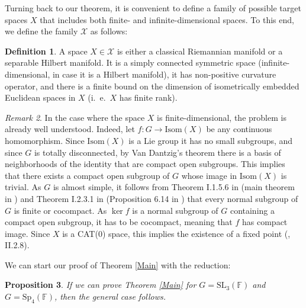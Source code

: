 \documentclass{article}
\theoremstyle{definition}
\newtheorem{dfn}{Definition}[section]
\theoremstyle{remark}
\newtheorem{rmk}[dfn]{Remark}
\theoremstyle{plain}
\newtheorem{prp}[dfn]{Proposition}
\begin{document}
Turning back to our theorem, it is convenient to define a family of possible target spaces $X$ that includes both finite- and infinite-dimensional spaces. To this end, we define the family $\mathcal{X}$ as follows:

\begin{dfn} \label{familyX}
    A space $X\in\mathcal{X}$ is either a classical Riemannian manifold or a separable Hilbert manifold. It is a simply connected symmetric space (infinite-dimensional, in case it is a Hilbert manifold), it has non-positive curvature operator, and there is a finite bound on the dimension of isometrically embedded Euclidean spaces in $X$ (i.~e.~$X$ has finite rank). \\
\end{dfn}

\begin{rmk}
    In the case where the space $X$ is finite-dimensional, the problem is already well understood. Indeed, let $f: G\rightarrow\mathrm{Isom}(X)$ be any continuous homomorphism. Since $\mathrm{Isom}(X)$ is a Lie group it has no small subgroups, and since $G$ is totally disconnected, by Van Dantzig's theorem there is a basis of neighborhoods of the identity that are compact open subgroups. This implies that there exists a compact open subgroup of $G$ whose image in $\mathrm{Isom}(X)$ is trivial. As $G$ is almost simple, it follows from Theorem I.1.5.6 in \cite{margulis} (main theorem in \cite{tits1}) and Theorem I.2.3.1 in \cite{margulis} (Proposition 6.14 in \cite{boreltits4}) that every normal subgroup of $G$ is finite or cocompact. As $\ker{f}$ is a normal subgroup of $G$ containing a compact open subgroup, it has to be cocompact, meaning that $f$ has compact image. Since $X$ is a CAT(0) space, this implies the existence of a fixed point (\cite{bh}, II.2.8). \\
\end{rmk}

We can start our proof of Theorem \ref{Main} with the reduction:

\begin{prp} \label{unbounded}
    If we can prove Theorem \ref{Main} for $G=\mathrm{SL}_3(\mathbb{F})$ and $G=\mathrm{Sp}_4(\mathbb{F})$, then the general case follows.
\end{prp}
\end{document}
